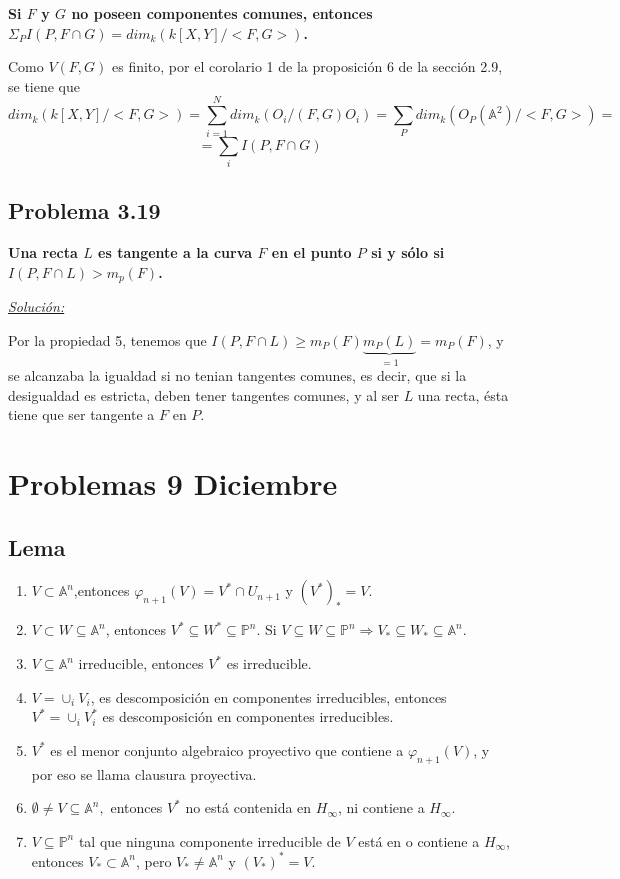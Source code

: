 \textbf{Si $F$ y $G$ no poseen componentes comunes, entonces $\Sigma_P I(P,F\cap G) = dim_k(k[X,Y]/<F,G>)$.}

\begin{Dem}
Como $V(F,G)$ es finito, por el corolario 1 de la proposición 6 de la sección 2.9, se tiene que $$dim_k(k[X,Y]/<F,G>)= \sum_{i=1}^N dim_k(O_i/(F,G)O_i) = \sum_P dim_k(O_P(\mathbb{A}^2)/<F,G>)=$$ $$= \sum_i I(P, F\cap G)$$
\end{Dem}

\subsection{Problema 3.19}

\textbf{Una recta $L$ es tangente a la curva $F$ en el punto $P$ si y sólo si $I(P, F\cap L)> m_p(F)$.}

\vspace{2mm}
\underline{\textit{Solución: }}

Por la propiedad 5, tenemos que $I(P,F\cap L)\ge m_P(F)\underbrace{m_P(L)}_{=1} = m_P(F)$, y se alcanzaba la igualdad si no tenian tangentes comunes, es decir, que si la desigualdad es estricta, deben tener tangentes comunes, y al ser $L$ una recta, ésta tiene que ser tangente a $F$ en $P$.

\newpage

\section{Problemas 9 Diciembre}

\subsection{Lema}
\begin{enumerate}
\item $V\subset \mathbb{A}^n$,entonces $\varphi_{n+1}(V)=V^* \cap U_{n+1}$ y $(V^*)_*=V$.
\item $V\subset W \subseteq \mathbb{A}^n$, entonces $V^*\subseteq W^* \subseteq \mathbb{P}^n$. Si $V\subseteq W \subseteq \mathbb{P}^n \Rightarrow V_*\subseteq W_* \subseteq \mathbb{A}^n$. 
\item $V\subseteq \mathbb{A}^n$ irreducible, entonces $V^*$ es irreducible. 
\item $V=\cup_i V_i$, es descomposición en componentes irreducibles, entonces $V^*=\cup_i V_i^*$ es descomposición en componentes irreducibles.
\item $V^*$ es el menor conjunto algebraico proyectivo que contiene a $\varphi_{n+1}(V)$, y por eso se llama clausura proyectiva. 
\item $\emptyset \neq V\subseteq \mathbb{A}^n,$ entonces $V^*$ no está contenida en $H_\infty$, ni contiene a $H_\infty$. 
\item $V\subseteq \mathbb{P}^n$ tal que ninguna componente irreducible de $V$ está en o contiene a $H_\infty$, entonces $V_*\subset \mathbb{A}^n$, pero $V_*\not = \mathbb{A}^n$ y $(V_*)^*=V$. 
\end{enumerate}

